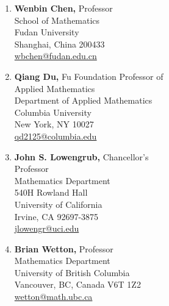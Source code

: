 \documentclass[11pt]{letter}
\begin{document}
	\begin{multicols}{2}

	
	
	\begin{enumerate}
	\item
\textbf{Wenbin Chen,} Professor
	\\
School of Mathematics
	\\
Fudan University
	\\
Shanghai, China 200433
	\\
\url{wbchen@fudan.edu.cn}
	
	\item	
\textbf{Qiang Du,} Fu Foundation Professor of 
	\\
\hspace*{0.25in} Applied Mathematics
	\\
Department of Applied Mathematics
	\\
Columbia University
	\\
New York, NY 10027
	\\
\url{qd2125@columbia.edu}


	\item
\textbf{John S. Lowengrub,} Chancellor's 
	\\
\hspace*{0.25in} Professor
	\\
Mathematics Department
 	\\
540H Rowland Hall
	\\
University of California
	\\
Irvine, CA 92697-3875
	\\
\url{jlowengr@uci.edu}

	\item
\textbf{Brian Wetton,} Professor
	\\
Mathematics Department
	\\
University of British Columbia 
	\\
Vancouver, BC, Canada V6T 1Z2
	\\
\url{wetton@math.ubc.ca}
	

\end{enumerate}
\end{multicols}
\end{document}
